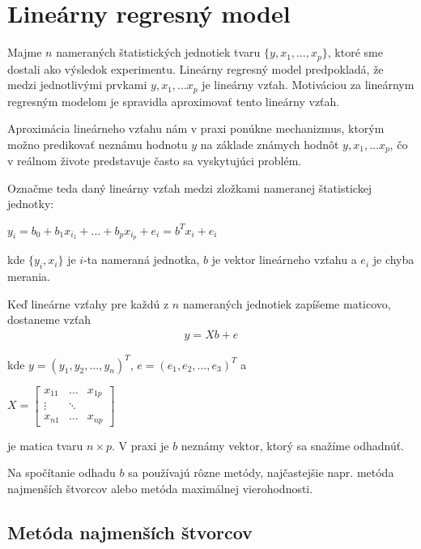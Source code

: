 \section{Lineárny regresný model}
\label{linear regression}
 
Majme $n$ nameraných štatistických jednotiek tvaru $\{ y, x_1, \ldots, x_p \}$, 
ktoré sme dostali ako výsledok experimentu. 
Lineárny regresný model predpokladá, že medzi jednotlivými prvkami $y, x_1, ... x_p$ je lineárny vzťah. 
Motiváciou za lineárnym regresným modelom je spravidla aproximovať tento lineárny vzťah.

Aproximácia lineárneho vzťahu nám v praxi ponúkne mechanizmus, 
ktorým možno predikovať neznámu hodnotu $y$ na základe známych hodnôt $y, x_1, ... x_p$, 
čo v reálnom živote predstavuje často sa vyskytujúci problém.

Označme teda daný lineárny vzťah medzi zložkami nameranej štatistickej jednotky:

\begin{center}
$
y_i = b_0 + b_1 x_{i_1} + … + b_p x_{i_p} + e_i = b^T x_i + e_i
$
\end{center}

kde $\{ y_i, x_i \}$ je $i$-ta nameraná jednotka, $b$ je vektor lineárneho vzťahu
a $e_i$ je chyba merania.

Keď lineárne vzťahy pre každú z $n$ nameraných jednotiek zapíšeme maticovo, dostaneme vzťah
\begin{align}
\label{linear regression formula}
y = Xb + e
\end{align}

kde $y = (y_1, y_2, \ldots, y_n)^T$, $e = (e_1, e_2, \ldots, e_3)^T$ a

\begin{center}
$
X =
\begin{bmatrix}
x_{11} & \ldots & x_{1p} \\
\vdots & \ddots & \\
x_{n1} & \ldots & x_{np} 
\end{bmatrix}
$
\end{center}

je matica tvaru $n \times p$. V praxi je $b$ neznámy vektor, ktorý sa snažíme odhadnúť.

Na spočítanie odhadu $b$ sa používajú rôzne metódy,
najčastejšie napr. metóda najmenších štvorcov alebo metóda maximálnej vierohodnosti.

\subsection{Metóda najmenších štvorcov}

